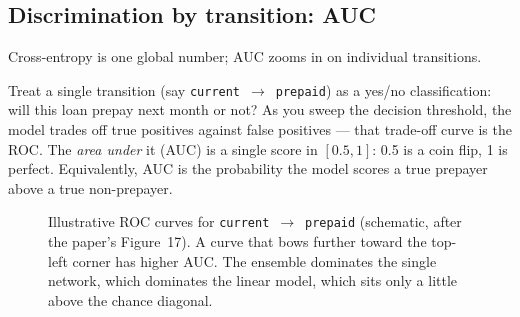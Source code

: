 \documentclass[11pt]{article}
\newcommand{\state}[1]{\texttt{#1}}
\begin{document}
\subsection{Discrimination by transition: AUC}

Cross-entropy is one global number; AUC zooms in on individual transitions.

\begin{jargon}
Treat a single transition (say \state{current}~$\to$~\state{prepaid}) as a yes/no
classification: will this loan prepay next month or not? As you sweep the decision
threshold, the model trades off true positives against false positives --- that trade-off
curve is the ROC. The \emph{area under} it (AUC) is a single score in $[0.5, 1]$: 0.5 is a
coin flip, 1 is perfect. Equivalently, AUC is the probability the model scores a true
prepayer above a true non-prepayer.
\end{jargon}

\begin{figure}[H]
\centering
{}
\caption{Illustrative ROC curves for \state{current}~$\to$~\state{prepaid} (schematic, after
the paper's Figure~17). A curve that bows further toward the top-left corner has higher AUC.
The ensemble dominates the single network, which dominates the linear model, which sits only
a little above the chance diagonal.}
\end{figure}
\end{document}
